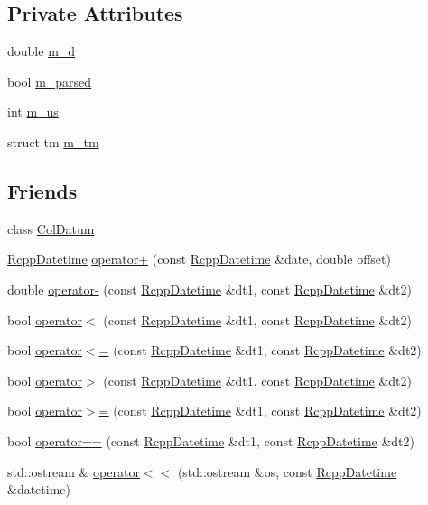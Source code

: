 \subsection*{Private Attributes}
\begin{CompactItemize}
\item 
double \hyperlink{classRcppDatetime_1af187ff381bfa0f5b57d28b64d7b60c}{m\_\-d}
\item 
bool \hyperlink{classRcppDatetime_515e3390c1834e58ce6bba39854638ad}{m\_\-parsed}
\item 
int \hyperlink{classRcppDatetime_68b9c7b759ffbba14aca3ae0680ea8a4}{m\_\-us}
\item 
struct tm \hyperlink{classRcppDatetime_3f65c708657270208656c1be885e9f1b}{m\_\-tm}
\end{CompactItemize}
\subsection*{Friends}
\begin{CompactItemize}
\item 
class \hyperlink{classRcppDatetime_2740dcf7de2c2f5471d8fa18944a98d7}{ColDatum}
\item 
\hyperlink{classRcppDatetime}{RcppDatetime} \hyperlink{classRcppDatetime_29513e04f8cb90b2a7efea97f8cbd37a}{operator+} (const \hyperlink{classRcppDatetime}{RcppDatetime} \&date, double offset)
\item 
double \hyperlink{classRcppDatetime_946df17f9ce3c423518d0db74e2bbbc4}{operator-} (const \hyperlink{classRcppDatetime}{RcppDatetime} \&dt1, const \hyperlink{classRcppDatetime}{RcppDatetime} \&dt2)
\item 
bool \hyperlink{classRcppDatetime_142f9346629bf7a6f673ba05d9338cf3}{operator$<$} (const \hyperlink{classRcppDatetime}{RcppDatetime} \&dt1, const \hyperlink{classRcppDatetime}{RcppDatetime} \&dt2)
\item 
bool \hyperlink{classRcppDatetime_7d98733f95f5647ac10bb8236c1a7a8d}{operator$<$=} (const \hyperlink{classRcppDatetime}{RcppDatetime} \&dt1, const \hyperlink{classRcppDatetime}{RcppDatetime} \&dt2)
\item 
bool \hyperlink{classRcppDatetime_062107b2e2809a60c67f80da5dab77ed}{operator$>$} (const \hyperlink{classRcppDatetime}{RcppDatetime} \&dt1, const \hyperlink{classRcppDatetime}{RcppDatetime} \&dt2)
\item 
bool \hyperlink{classRcppDatetime_1aac48969216af0555677a43b3617781}{operator$>$=} (const \hyperlink{classRcppDatetime}{RcppDatetime} \&dt1, const \hyperlink{classRcppDatetime}{RcppDatetime} \&dt2)
\item 
bool \hyperlink{classRcppDatetime_c6643666732e0a62c501da9f0ae9e342}{operator==} (const \hyperlink{classRcppDatetime}{RcppDatetime} \&dt1, const \hyperlink{classRcppDatetime}{RcppDatetime} \&dt2)
\item 
std::ostream \& \hyperlink{classRcppDatetime_778b21a52b7f2b17978933c3ec27754e}{operator$<$$<$} (std::ostream \&os, const \hyperlink{classRcppDatetime}{RcppDatetime} \&datetime)
\end{CompactItemize}


